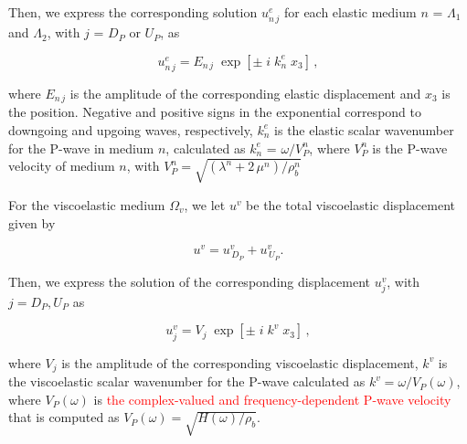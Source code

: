 \documentclass[draft]{agujournal2019}
\newcommand{\red}{\textcolor{red}}
\begin{document}
Then, we express the corresponding solution $u_{n\,j}^e$ for each elastic medium $n$ = $\Lambda_1$ and $\Lambda_2$, with $j$ = $D_P$ or $U_P$, as
\begin{linenomath*}
\begin{equation}\label{Eq.16}
u_{n\,j}^e = E_{n \,j} \;\exp[ \pm\; i \; k_{n}^e \; x_3 ]\,,
\end{equation}
\end{linenomath*}
where $E_{n \,j}$ is the amplitude of the corresponding elastic displacement and $x_3$ is the position. Negative and positive signs in the exponential correspond to downgoing and upgoing waves, respectively, $ k_{n}^e$ is the elastic scalar wavenumber for the P-wave in medium $n$, calculated as $ k_{n}^e$ = $\omega / V_P^n$, where $V_P^n$ is the P-wave velocity of medium $n$, with $V_P^n = \sqrt{(\lambda^n +  2\, \mu^n)/\rho_b^n}$

For the viscoelastic medium $\Omega_v$, we let  $u^v$ be the total viscoelastic displacement given by 
\begin{linenomath*}
\begin{equation}\label{Eq.17}
u^v=  u_{\,D_P}^v  + u_{\,U_P}^v.
\end{equation}
\end{linenomath*}

Then, we express the solution of the corresponding displacement $u_j^v$, with $j = D_P , U_P$ as
\begin{linenomath*}
\begin{equation}\label{Eq.18}
u_j^v = V_j \;\exp[ \pm\; i \; k^v \; x_3 ]\,,
\end{equation}
\end{linenomath*}
where $V_j$ is the amplitude of the corresponding viscoelastic displacement, $ k^v$ is the viscoelastic scalar wavenumber for the P-wave calculated as $ k^v=\omega / V_P(\omega)$, where $V_P(\omega)$ is 
\red{
the complex-valued and frequency-dependent P-wave velocity}
that is computed as $V_P(\omega) = \sqrt{H(\omega) /\rho_b }$.
\end{document}
